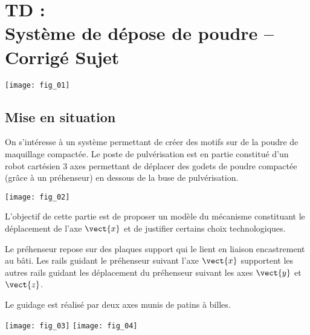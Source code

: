 \chapter*{TD  :\\ 
Système de dépose de poudre -- \ifprof Corrigé \else Sujet \fi}

\iflivret {} \else
\ifprof  {} \else \fi
\fi

\setcounter{question}{0}

\begin{marginfigure}
\texttt{[image: fig\_01]}
\end{marginfigure}


\section*{Mise en situation}
\ifprof
\else
On s'intéresse à un système permettant de créer des motifs sur de la poudre de maquillage compactée. Le poste de pulvérisation est en partie constitué d'un robot cartésien 3 axes permettant de déplacer des godets de poudre compactée (grâce à un préhenseur) en dessous de la buse de pulvérisation. 

\begin{center}
\texttt{[image: fig\_02]}
\end{center}

\fi

\begin{obj}
L’objectif de cette partie est de proposer un modèle du mécanisme constituant le déplacement de l’axe $\vect{x}$ et de justifier certains choix technologiques.
\end{obj}

\ifprof
\else
Le préhenseur repose sur des plaques support qui le lient en liaison encastrement au bâti. Les rails
guidant le préhenseur suivant l’axe $\vect{x}$ supportent les autres rails guidant les déplacement du préhenseur suivant les axes $\vect{y}$ et $\vect{z}$.

Le guidage est réalisé par deux axes munis de patins à billes.

\begin{marginfigure}
\texttt{[image: fig\_03]}
\texttt{[image: fig\_04]}
\end{marginfigure}

